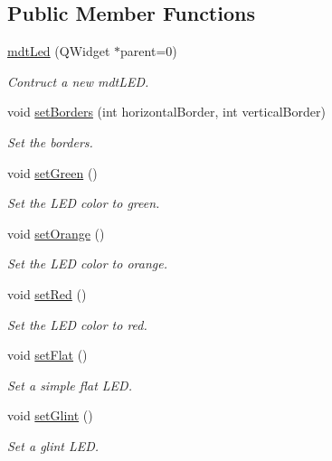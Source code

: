 \subsection*{Public Member Functions}
\begin{DoxyCompactItemize}
\item 
\hyperlink{classmdt_led_a64d5de3a8c2e4937d9ca9328b5ae4f9c}{mdtLed} (QWidget $\ast$parent=0)
\begin{DoxyCompactList}\small\item\em Contruct a new mdtLED. \end{DoxyCompactList}\item 
void \hyperlink{classmdt_led_a1271e1dfe07e8ff459d7f20e55ab3bc4}{setBorders} (int horizontalBorder, int verticalBorder)
\begin{DoxyCompactList}\small\item\em Set the borders. \end{DoxyCompactList}\item 
void \hyperlink{classmdt_led_a5f3b4975c423ac35442ec2b9c546b0e4}{setGreen} ()
\begin{DoxyCompactList}\small\item\em Set the LED color to green. \end{DoxyCompactList}\item 
void \hyperlink{classmdt_led_a5cdd40d1e3baefab72d9cda866353797}{setOrange} ()
\begin{DoxyCompactList}\small\item\em Set the LED color to orange. \end{DoxyCompactList}\item 
void \hyperlink{classmdt_led_a28e208fb105c99b21d81d4c82ed50a98}{setRed} ()
\begin{DoxyCompactList}\small\item\em Set the LED color to red. \end{DoxyCompactList}\item 
void \hyperlink{classmdt_led_a664ca4c83ec0faaa86bd3f932fb06d5b}{setFlat} ()
\begin{DoxyCompactList}\small\item\em Set a simple flat LED. \end{DoxyCompactList}\item 
void \hyperlink{classmdt_led_a8ec814fdc4910476e7479649ba3f6204}{setGlint} ()
\begin{DoxyCompactList}\small\item\em Set a glint LED. \end{DoxyCompactList}\item 

\end{DoxyCompactItemize}
